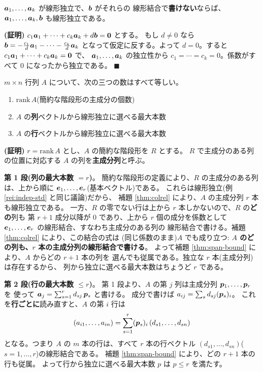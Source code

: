 \begin{teiri}[補題:独立な組の拡張]\label{thm:extend-indep}
$\bm{a}_1, \dots, \bm{a}_k$ が線形独立で、$\bm{b}$ がそれらの
線形結合で\textbf{書けない}ならば、$\bm{a}_1, \dots, \bm{a}_k, \bm{b}$
も線形独立である。
\end{teiri}

\noindent\textbf{(証明)}\quad
$c_1\bm{a}_1 + \cdots + c_k\bm{a}_k + d\bm{b} = \bm{0}$ とする。
もし $d \neq 0$ なら
$\bm{b} = -\frac{c_1}{d}\bm{a}_1 - \cdots - \frac{c_k}{d}\bm{a}_k$
となって仮定に反する。よって $d = 0$。すると
$c_1\bm{a}_1 + \cdots + c_k\bm{a}_k = \bm{0}$ で、
$\bm{a}_1, \dots, \bm{a}_k$ の独立性から
$c_1 = \cdots = c_k = 0$。係数がすべて $0$ になったから独立である。
 $\blacksquare$

\begin{teiri}[行 rank = 列 rank]\label{thm:rank-rowcol}
$m \times n$ 行列 $A$ について、次の三つの数はすべて等しい。
\begin{enumerate}
\item $\mathrm{rank}\,A$(簡約な階段形の主成分の個数)
\item $A$ の\textbf{列}ベクトルから線形独立に選べる最大本数
\item $A$ の\textbf{行}ベクトルから線形独立に選べる最大本数
\end{enumerate}
\end{teiri}

\noindent\textbf{(証明)}\quad
$r = \mathrm{rank}\,A$ とし、$A$ の簡約な階段形を $R$ とする。
$R$ で主成分のある列の位置に対応する $A$ の列を\textbf{主成分列}と呼ぶ。

\textbf{第 1 段(列の最大本数 $= r$)}。
簡約な階段形の定義により、$R$ の主成分のある列は、上から順に
$\bm{e}_1, \dots, \bm{e}_r$(基本ベクトル)である。
これらは線形独立(例 \ref{rei:indep-std} と同じ議論)だから、
補題 \ref{thm:colrel} により、$A$ の主成分列 $r$ 本も線形独立である。
一方、$R$ の零でない行は上から $r$ 本しかないので、$R$ の\textbf{どの}列も
第 $r + 1$ 成分以降が $0$ であり、上から $r$ 個の成分を係数として
$\bm{e}_1, \dots, \bm{e}_r$ の線形結合、すなわち主成分のある列の
線形結合で書ける。補題 \ref{thm:colrel} により、この結合の式は
(同じ係数のまま)$A$ でも成り立つ:
\textbf{$A$ のどの列も、$r$ 本の主成分列の線形結合で書ける}。
よって補題 \ref{thm:span-bound} により、$A$ からどの $r + 1$ 本の列を
選んでも従属である。独立な $r$ 本(主成分列)は存在するから、
列から独立に選べる最大本数はちょうど $r$ である。

\textbf{第 2 段(行の最大本数 $\le r$)}。
第 1 段より、$A$ の第 $j$ 列は主成分列 $\bm{p}_1, \dots, \bm{p}_r$ を
使って $\bm{a}_j = \sum_{s=1}^{r} d_{sj}\,\bm{p}_s$ と書ける。
成分で書けば $a_{ij} = \sum_s d_{sj} (\bm{p}_s)_i$。
これを\textbf{行ごとに}読み直すと、$A$ の第 $i$ 行は
\[
(a_{i1}, \dots, a_{in})
= \sum_{s=1}^{r} (\bm{p}_s)_i \,(d_{s1}, \dots, d_{sn})
\]
となる。つまり $A$ の $m$ 本の行は、すべて $r$ 本の行ベクトル
$(d_{s1}, \dots, d_{sn})$($s = 1, \dots, r$)の線形結合である。
補題 \ref{thm:span-bound} により、どの $r + 1$ 本の行も従属。
よって行から独立に選べる最大本数 $p$ は $p \le r$ を満たす。

